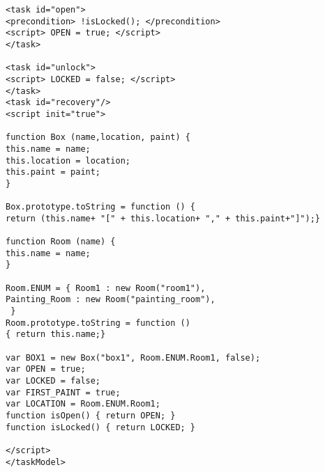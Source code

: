 \begin{verbatim}
<task id="open">
<precondition> !isLocked(); </precondition>
<script> OPEN = true; </script>
</task>

<task id="unlock">
<script> LOCKED = false; </script>
</task>
<task id="recovery"/>  
<script init="true">

function Box (name,location, paint) {
this.name = name;
this.location = location;
this.paint = paint;
}

Box.prototype.toString = function () { 
return (this.name+ "[" + this.location+ "," + this.paint+"]");}

function Room (name) { 
this.name = name; 
}

Room.ENUM = { Room1 : new Room("room1"), 
Painting_Room : new Room("painting_room"),
 }
Room.prototype.toString = function ()
{ return this.name;}

var BOX1 = new Box("box1", Room.ENUM.Room1, false);
var OPEN = true;
var LOCKED = false;
var FIRST_PAINT = true;
var LOCATION = Room.ENUM.Room1; 
function isOpen() { return OPEN; }
function isLocked() { return LOCKED; }

</script>  
</taskModel>
\end{verbatim}